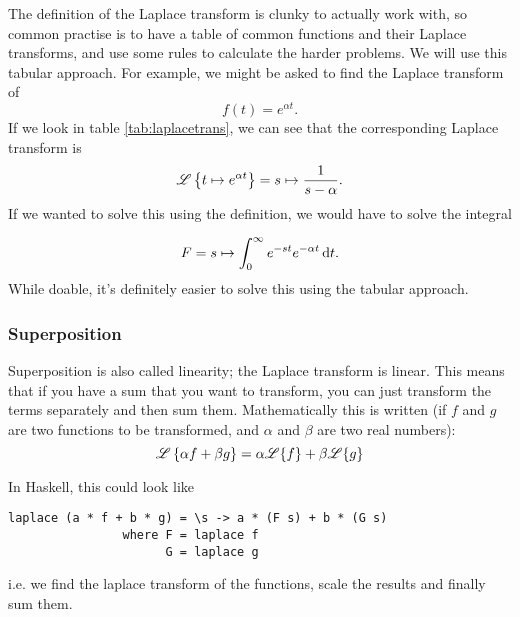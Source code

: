 The definition of the Laplace transform is clunky to actually work with, so common practise is to have a table of common functions and their Laplace transforms, and use some rules to calculate the harder problems. 
We will use this tabular approach. For example, we might be asked to find the Laplace transform of 
\begin{equation*}
    f(t) = e^{\alpha t}.
\end{equation*}
If we look in table \ref{tab:laplacetrans}, we can see that the corresponding Laplace transform is 
\begin{equation*}
    \mathscr{L} \left\{ t \mapsto e^{\alpha t}\right\} =  s \mapsto \frac{1}{s-\alpha}.
\end{equation*}
If we wanted to solve this using the definition, we would have to solve the integral 

\begin{equation*}
    F =  s \mapsto \int_0^\infty e^{-st} e^{-\alpha t} \, \dd t.
\end{equation*}
While doable, it's definitely easier to solve this using the tabular approach. 


\subsubsection{Superposition} 
Superposition is also called linearity; the Laplace transform is linear. This means that if you have a sum that you want to transform, you can just transform the terms separately and then sum them. Mathematically this is written (if $f$ and $g$ are two functions to be transformed, and $\alpha$ and $\beta$ are two real numbers):
\begin{equation*}
    \mathscr{L} \left\{\alpha f + \beta g\right\} = \alpha \mathscr{L}\{f\} + \beta \mathscr{L} \{g\} 
\end{equation*}

In Haskell, this could look like

\begin{verbatim}
laplace (a * f + b * g) = \s -> a * (F s) + b * (G s)
                where F = laplace f
                      G = laplace g
\end{verbatim} 
i.e. we find the laplace transform of the functions, scale the results and finally sum them. 

